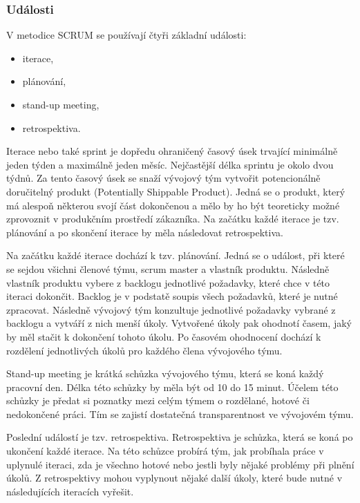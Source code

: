 \documentclass[czech,DP]{thesiskiv}
\begin{document}
\subsubsection{Události}
V metodice SCRUM se používají čtyři základní události:
\begin{itemize}
    \item iterace,
    \item plánování,
    \item stand-up meeting,
    \item retrospektiva.
\end{itemize}
Iterace nebo také sprint je dopředu ohraničený časový úsek trvající minimálně jeden týden a maximálně jeden měsíc. Nejčastější délka sprintu je okolo dvou týdnů. Za tento časový úsek se snaží vývojový tým vytvořit potencionálně doručitelný produkt (Potentially Shippable Product). Jedná se o produkt, který má alespoň některou svojí část dokončenou a mělo by ho být teoreticky možné zprovoznit v produkčním prostředí zákazníka. Na začátku každé iterace je tzv. plánování a po skončení iterace by měla následovat retrospektiva.
\par
Na začátku každé iterace dochází k tzv. plánování. Jedná se o událost, při které se sejdou všichni členové týmu, scrum master a vlastník produktu. Následně vlastník produktu vybere z backlogu jednotlivé požadavky, které chce v této iteraci dokončit. Backlog je v podstatě soupis všech požadavků, které je nutné zpracovat. Následně vývojový tým konzultuje jednotlivé požadavky vybrané z backlogu a vytváří z nich menší úkoly. Vytvořené úkoly pak ohodnotí časem, jaký by měl stačit k dokončení tohoto úkolu. Po časovém ohodnocení dochází k rozdělení jednotlivých úkolů pro každého člena vývojového týmu.
\par
Stand-up meeting je krátká schůzka vývojového týmu, která se koná každý pracovní den. Délka této schůzky by měla být od 10 do 15 minut. Účelem této schůzky je předat si poznatky mezi celým týmem o rozdělané, hotové či nedokončené práci. Tím se zajistí dostatečná transparentnost ve vývojovém týmu.
\par
Poslední událostí je tzv. retrospektiva. Retrospektiva je schůzka, která se koná po ukončení každé iterace. Na této schůzce probírá tým, jak probíhala práce v uplynulé iteraci, zda je všechno hotové nebo jestli byly nějaké problémy při plnění úkolů. Z retrospektivy mohou vyplynout nějaké další úkoly, které bude nutné v následujících iteracích vyřešit.\cite{SCRUMImg}
\end{document}
